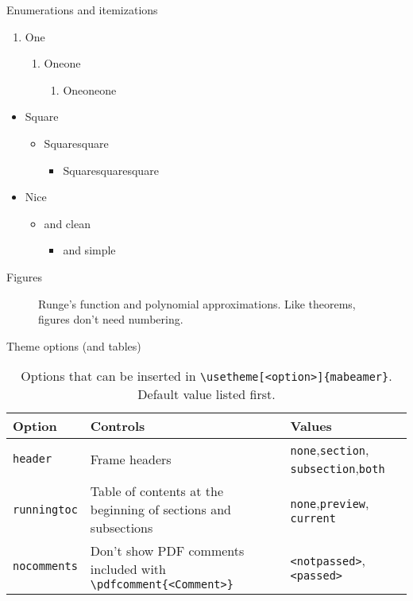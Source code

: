 \documentclass{beamer}
\begin{document}
\begin{frame}{Enumerations and itemizations}
\begin{enumerate}
	\item One
	\begin{enumerate}
		\item Oneone
		\begin{enumerate}
			\item Oneoneone
		\end{enumerate}
	\end{enumerate}
\end{enumerate}
\begin{itemize}
	\item Square
	\begin{itemize}
		\item Squaresquare
		\begin{itemize}
			\item Squaresquaresquare
		\end{itemize}
	\end{itemize}
\end{itemize}
\begin{itemize}
	\item[\summarize] Nice
	\begin{itemize}
	\item[\summarize] and clean
	\begin{itemize}
		\item[\summarize] and simple
	\end{itemize}
	\end{itemize}
\end{itemize}
\end{frame}
	
\begin{frame}{Figures}
\begin{figure}
	\scalebox{0.6}{}
	\caption{Runge's function and polynomial approximations. Like theorems, figures don't need numbering.}
\end{figure}
\end{frame}

\begin{frame}{Theme options (and tables)}
\begin{table}[]
	\begin{tabularx}{\linewidth}{l>{\raggedright}XX}
			\toprule
			\textbf{Option}			& \textbf{Controls} & \textbf{Values} \tabularnewline
			\midrule
			\verb|header|		&  Frame headers & \verb|none|,\verb|section|, \verb|subsection|,\verb|both| \tabularnewline
			\verb|runningtoc|		& 	Table of contents at the beginning of sections and subsections & \verb|none|,\verb|preview|, \verb|current| \tabularnewline
			\verb|nocomments| & 	Don't show PDF comments \pdfcomment{<Your comment>} included with \verb|\pdfcomment{<Comment>}| & \verb|<notpassed>|, \verb|<passed>|  \tabularnewline
			\bottomrule
	\end{tabularx}
	\caption{Options that can be inserted in \texttt{\textbackslash usetheme[<option>]\{mabeamer\}}. Default value listed first.}
\end{table}
\end{frame}
\end{document}
